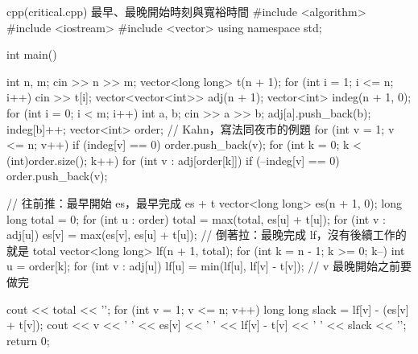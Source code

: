 \begin{example}[label=ex:critical]{cpp}{(critical.cpp) 最早、最晚開始時刻與寬裕時間}
#include <algorithm>
#include <iostream>
#include <vector>
using namespace std;

int main() {
    int n, m;
    cin >> n >> m;
    vector<long long> t(n + 1);
    for (int i = 1; i <= n; i++) {
        cin >> t[i];
    }
    vector<vector<int>> adj(n + 1);
    vector<int> indeg(n + 1, 0);
    for (int i = 0; i < m; i++) {
        int a, b;
        cin >> a >> b;
        adj[a].push_back(b);
        indeg[b]++;
    }
    vector<int> order;                       // Kahn，寫法同夜市的例題
    for (int v = 1; v <= n; v++) {
        if (indeg[v] == 0) {
            order.push_back(v);
        }
    }
    for (int k = 0; k < (int)order.size(); k++) {
        for (int v : adj[order[k]]) {
            if (--indeg[v] == 0) {
                order.push_back(v);
            }
        }
    }

    // 往前推：最早開始 es，最早完成 es + t
    vector<long long> es(n + 1, 0);
    long long total = 0;
    for (int u : order) {
        total = max(total, es[u] + t[u]);
        for (int v : adj[u]) {
            es[v] = max(es[v], es[u] + t[u]);
        }
    }
    // 倒著拉：最晚完成 lf，沒有後續工作的就是 total
    vector<long long> lf(n + 1, total);
    for (int k = n - 1; k >= 0; k--) {
        int u = order[k];
        for (int v : adj[u]) {
            lf[u] = min(lf[u], lf[v] - t[v]);   // v 最晚開始之前要做完
        }
    }

    cout << total << '\n';
    for (int v = 1; v <= n; v++) {
        long long slack = lf[v] - (es[v] + t[v]);
        cout << v << ' ' << es[v] << ' ' << lf[v] - t[v] << ' ' << slack << '\n';
    }
    return 0;
}
\end{example}


